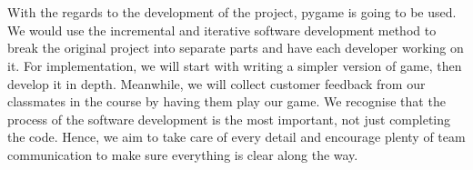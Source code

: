 \documentclass[12pt]{article}
\begin{document}
\\\\With the regards to the development of the project, pygame is going to be used. We would use the incremental and iterative software development method to break the original project into separate parts and have each developer working on it. For implementation, we will start with writing a simpler version of game, then develop it in depth. Meanwhile, we will collect customer feedback from our classmates in the course by having them play our game. We recognise that the process of the software development is the most important, not just completing the code. Hence, we aim to take care of every detail and encourage plenty of team communication to make sure everything is clear along the way.
\end{document}
